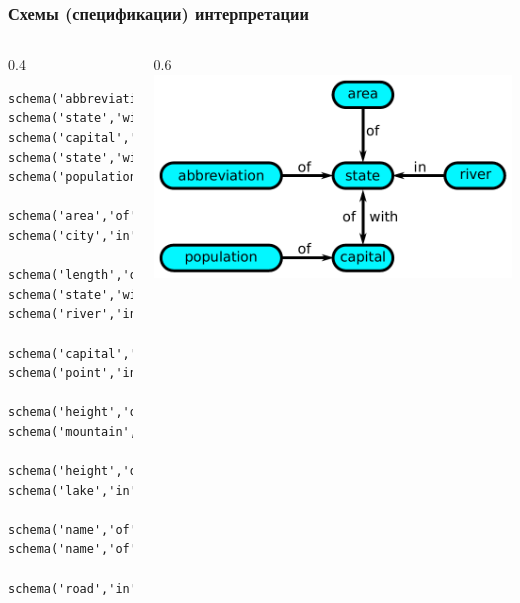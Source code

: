 \documentclass[10pt]{beamer}
\begin{document}
\begin{frame}[fragile]
  \frametitle{Схемы (спецификации) интерпретации}
  \begin{columns}
    \begin{column}{0.4\textwidth}
\begin{verbatim}
schema('abbreviation','of','state').
schema('state','with','abbreviation').
schema('capital','of','state').
schema('state','with','capital').
schema('population','of','state').

schema('area','of','state').
schema('city','in','state').

schema('length','of','river').
schema('state','with','river').
schema('river','in','state').

schema('capital','with','population').
schema('point','in','state').

schema('height','of','point').
schema('mountain','in','state').

schema('height','of','mountain').
schema('lake','in','state').

schema('name','of','river').
schema('name','of','capital').

schema('road','in','continent').
\end{verbatim}
    \end{column}
    \begin{column}{0.6\textwidth}
      \includegraphics[width=1\linewidth]{pics/sem-net-1.pdf}
    \end{column}
  \end{columns}
\end{frame}
\end{document}
